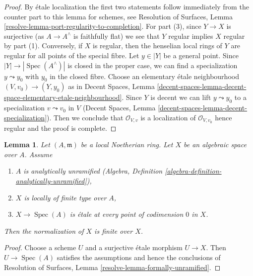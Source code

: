 \documentclass{stacks-project}
\theoremstyle{plain}
\newtheorem{lemma}[subsection]{Lemma}
\theoremstyle{definition}
\theoremstyle{remark}
\numberwithin{equation}{subsection}
\def\Spec{\mathop{\mathrm{Spec}}}
\begin{document}
\begin{proof}
By \'etale localization the first two statements follow
immediately from the counter part to this lemma for schemes, see
Resolution of Surfaces, Lemma \ref{resolve-lemma-port-regularity-to-completion}.
For part (3), since $Y \to X$ is surjective (as $A \to A^\wedge$
is faithfully flat) we see that $Y$ regular implies $X$ regular
by part (1). Conversely, if $X$ is regular, then the henselian
local rings of $Y$ are regular for all points of the special fibre.
Let $y \in |Y|$ be a general point.
Since $|Y| \to |\Spec(A^\wedge)|$ is closed in the proper
case, we can find a specialization $y \leadsto y_0$ with
$y_0$ in the closed fibre. Choose an elementary \'etale
neighbourhood $(V, v_0) \to (Y, y_0)$ as in
Decent Spaces, Lemma
\ref{decent-spaces-lemma-decent-space-elementary-etale-neighbourhood}.
Since $Y$ is decent we can lift $y \leadsto y_0$ to a specialization
$v \leadsto v_0$ in $V$
(Decent Spaces, Lemma \ref{decent-spaces-lemma-decent-specialization}).
Then we conclude that
$\mathcal{O}_{V, v}$ is a localization of $\mathcal{O}_{V, v_0}$
hence regular and the proof is complete.
\end{proof}

\begin{lemma}
\label{lemma-formally-unramified}
Let $(A, \mathfrak m)$ be a local Noetherian ring. Let
$X$ be an algebraic space over $A$. Assume
\begin{enumerate}
\item $A$ is analytically unramified
(Algebra, Definition \ref{algebra-definition-analytically-unramified}),
\item $X$ is locally of finite type over $A$,
\item $X \to \Spec(A)$ is \'etale at every point of codimension $0$ in $X$.
\end{enumerate}
Then the normalization of $X$ is finite over $X$.
\end{lemma}

\begin{proof}
Choose a scheme $U$ and a surjective \'etale morphism $U \to X$.
Then $U \to \Spec(A)$ satisfies the assumptions and hence the
conclusions of
Resolution of Surfaces, Lemma \ref{resolve-lemma-formally-unramified}.
\end{proof}
\end{document}
